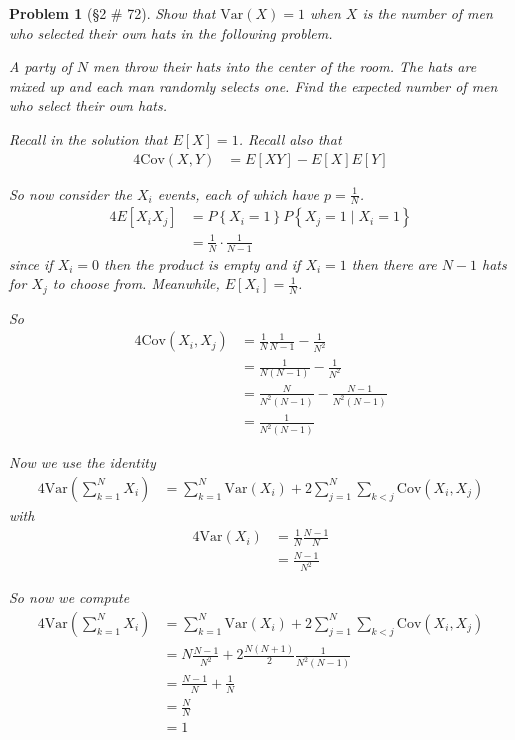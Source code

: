 \documentclass[11pt, oneside]{book}   	%
\newtheorem{problem}{Problem}[chapter]
\newcommand{\set}[1]{\left\{#1\right\}}
\newcommand{\var}[1]{\mathrm{Var}\left(#1\right)}
\newcommand{\cov}[1]{\mathrm{Cov}\left(#1\right)}
\begin{document}
\begin{problem}[\S 2 \# 72]
	Show that $\var{X}=1$ when $X$ is the number of men who selected their own hats in the following problem.
	
	A party of $N$ men throw their hats into the center of the room. The hats are mixed up and each man randomly selects one. Find the expected number of men who select their own hats. 
	
	Recall in the solution that $E[X]=1$. Recall also that 
	\begin{alignat}{4}
		\cov{X, Y}&=E[XY]-E[X]E[Y]
	\end{alignat}
	
	So now consider the $X_i$ events, each of which have $p=\frac{1}{N}$. 
	\begin{alignat}{4}
		E[X_iX_j]&=P\set{X_i=1}P\set{X_j=1\mid X_i=1} \\
			&=\frac{1}{N}\cdot \frac{1}{N-1}
	\end{alignat}
	since if $X_i=0$ then the product is empty and if $X_i=1$ then there are $N-1$ hats for $X_j$ to choose from. Meanwhile, $E[X_i]=\frac{1}{N}$. 
	
	So 
	\begin{alignat}{4}
		\cov{X_i, X_j} &= \frac{1}{N}\frac{1}{N-1} - \frac{1}{N^2} \\
			&=\frac{1}{N(N-1)}-\frac{1}{N^2} \\
			&=\frac{N}{N^2(N-1)}-\frac{N-1}{N^2(N-1)} \\
			&=\frac{1}{N^2(N-1)}
	\end{alignat}
	
	Now we use the identity 
	\begin{alignat}{4}
		\var{\sum_{k=1}^N X_i}&=\sum_{k=1}^N \var{X_i} + 2\sum_{j=1}^N\sum_{k<j}\cov{X_i, X_j}
	\end{alignat}
	with
	\begin{alignat}{4}
		\var{X_i}&=\frac{1}{N}\frac{N-1}{N} \\
			&=\frac{N-1}{N^2}
	\end{alignat}

	So now we compute 
	\begin{alignat}{4}
		\var{\sum_{k=1}^N X_i}&=\sum_{k=1}^N \var{X_i} + 2\sum_{j=1}^N\sum_{k<j}\cov{X_i, X_j} \\
			&=N\frac{N-1}{N^2} + 2 \frac{N(N+1)}{2}\frac{1}{N^2(N-1)} \\
			&=\frac{N-1}{N}+\frac{1}{N} \\
			&=\frac{N}{N} \\
			&=1
	\end{alignat}	


\end{problem}
\end{document}

